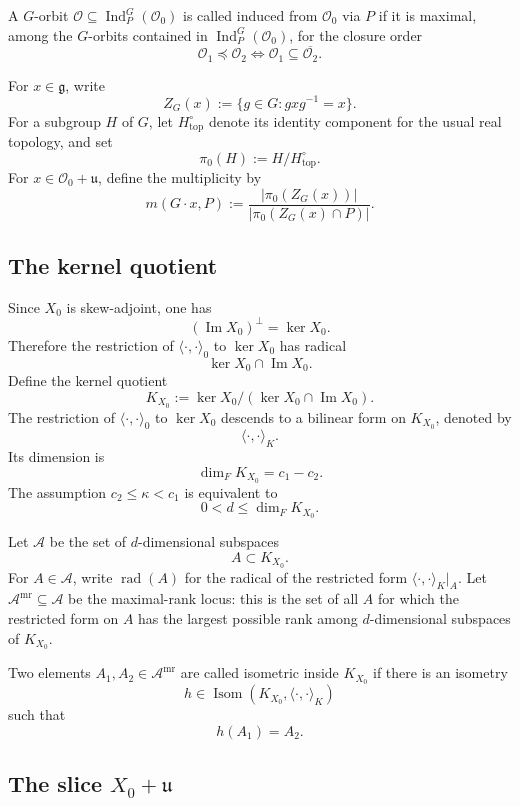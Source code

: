 \documentclass[
  11pt,
]{article}
\begin{document}
A \(G\)-orbit
\(\mathcal O\subseteq\operatorname{Ind}_P^G(\mathcal O_0)\) is called
induced from \(\mathcal O_0\) via \(P\) if it is maximal, among the
\(G\)-orbits contained in \(\operatorname{Ind}_P^G(\mathcal O_0)\), for
the closure order \[
\mathcal O_1\preceq \mathcal O_2
\iff
\mathcal O_1\subseteq\overline{\mathcal O_2}.
\]

For \(x\in\mathfrak g\), write \[
Z_G(x):=\{g\in G:gxg^{-1}=x\}.
\] For a subgroup \(H\) of \(G\), let \(H^\circ_{\mathrm{top}}\) denote
its identity component for the usual real topology, and set \[
\pi_0(H):=H/H^\circ_{\mathrm{top}}.
\] For \(x\in\mathcal O_0+\mathfrak u\), define the multiplicity by \[
m(G\cdot x,P):=
\frac{|\pi_0(Z_G(x))|}{|\pi_0(Z_G(x)\cap P)|}.
\]

\subsection{The kernel quotient}\label{the-kernel-quotient}

Since \(X_0\) is skew-adjoint, one has \[
(\operatorname{Im}X_0)^\perp=\ker X_0.
\] Therefore the restriction of \(\langle\cdot,\cdot\rangle_0\) to
\(\ker X_0\) has radical \[
\ker X_0\cap\operatorname{Im}X_0.
\] Define the kernel quotient \[
K_{X_0}:=\ker X_0/(\ker X_0\cap\operatorname{Im}X_0).
\] The restriction of \(\langle\cdot,\cdot\rangle_0\) to \(\ker X_0\)
descends to a bilinear form on \(K_{X_0}\), denoted by \[
\langle\cdot,\cdot\rangle_K.
\] Its dimension is \[
\dim_F K_{X_0}=c_1-c_2.
\] The assumption \(c_2\le\kappa<c_1\) is equivalent to \[
0<d\le \dim_F K_{X_0}.
\]

Let \(\mathscr A\) be the set of \(d\)-dimensional subspaces \[
A\subset K_{X_0}.
\] For \(A\in\mathscr A\), write \(\operatorname{rad}(A)\) for the
radical of the restricted form \(\langle\cdot,\cdot\rangle_K|_A\). Let
\(\mathscr A^{\mathrm{mr}}\subseteq\mathscr A\) be the maximal-rank
locus: this is the set of all \(A\) for which the restricted form on
\(A\) has the largest possible rank among \(d\)-dimensional subspaces of
\(K_{X_0}\).

Two elements \(A_1,A_2\in\mathscr A^{\mathrm{mr}}\) are called isometric
inside \(K_{X_0}\) if there is an isometry \[
h\in\operatorname{Isom}(K_{X_0},\langle\cdot,\cdot\rangle_K)
\] such that \[
h(A_1)=A_2.
\]

\subsection{\texorpdfstring{The slice
\(X_0+\mathfrak u\)}{The slice X\_0+\textbackslash mathfrak u}}\label{the-slice-x_0mathfrak-u}
\end{document}

